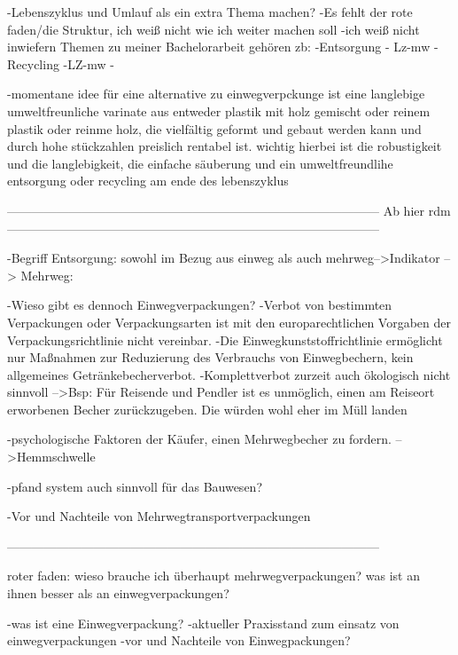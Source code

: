 

-Lebenszyklus und Umlauf als ein extra Thema machen?
-Es fehlt der rote faden/die Struktur, ich weiß nicht wie ich weiter machen soll
-ich weiß nicht inwiefern Themen zu meiner Bachelorarbeit gehören zb:
    -Entsorgung - Lz-mw
    -Recycling -LZ-mw
    -

-momentane idee für eine alternative zu einwegverpckunge ist eine langlebige umweltfreunliche varinate aus entweder plastik mit holz gemischt oder reinem plastik oder reinme holz, die vielfältig geformt und gebaut werden kann und durch hohe stückzahlen preislich rentabel ist. wichtig hierbei ist die robustigkeit und die langlebigkeit, die einfache säuberung und ein umweltfreundlihe entsorgung oder recycling am ende des lebenszyklus

------------------------------------------------------------------------------------------
Ab hier rdm
------------------------------------------------------------------------------------------

-Begriff Entsorgung: sowohl im Bezug aus einweg als auch mehrweg-->Indikator
--> Mehrweg: 


-Wieso gibt es dennoch Einwegverpackungen?
    -Verbot von bestimmten Verpackungen oder Verpackungsarten ist mit den europarechtlichen Vorgaben der Verpackungsrichtlinie nicht vereinbar.
    -Die Einwegkunststoffrichtlinie ermöglicht nur Maßnahmen zur Reduzierung des Verbrauchs von Einwegbechern, kein allgemeines Getränkebecherverbot. 
    -Komplettverbot zurzeit auch ökologisch nicht sinnvoll
        -->Bsp: Für Reisende und Pendler ist es unmöglich, einen am Reiseort erworbenen Becher zurückzugeben. Die würden wohl eher im Müll landen

-psychologische Faktoren der Käufer, einen Mehrwegbecher zu fordern.
    -->Hemmschwelle

-pfand system auch sinnvoll für das Bauwesen?


-Vor und Nachteile von Mehrwegtransportverpackungen


------------------------------------------------------------------------------------------


roter faden: wieso brauche ich überhaupt mehrwegverpackungen? was ist an ihnen besser als an einwegverpackungen?

    -was ist eine Einwegverpackung?
    -aktueller Praxisstand zum einsatz von einwegverpackungen
    -vor und Nachteile von Einwegpackungen?
    
